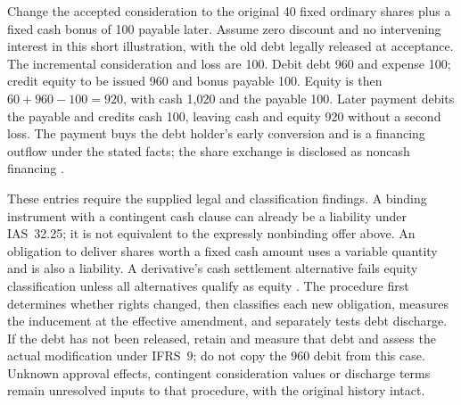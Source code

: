 Change the accepted consideration to the original 40 fixed ordinary shares
plus a fixed cash bonus of 100 payable later. Assume zero discount and no
intervening interest in this short illustration, with the old debt legally
released at acceptance. The incremental consideration and loss are 100.
Debit debt 960 and expense 100; credit equity to be issued 960 and bonus
payable 100. Equity is then $60+960-100=920$, with cash 1,020 and the payable
100. Later payment debits the payable and credits cash 100, leaving cash and
equity 920 without a second loss. The payment buys the debt holder's early
conversion and is a financing outflow under the stated facts; the share
exchange is disclosed as noncash financing
\citep[IAS~32.AG35; IAS~7.6, 17, 43--44]{eu20231803}.

These entries require the supplied legal and classification findings. A binding
instrument with a contingent cash clause can already be a liability under
IAS~32.25; it is not equivalent to the expressly nonbinding offer above.
An obligation to deliver shares worth a fixed cash amount uses a variable
quantity and is also a liability. A derivative's cash settlement alternative
fails equity classification unless all alternatives qualify as equity
\citep[IAS~32.19, 21, 25--27]{eu20231803}. The procedure first determines
whether rights changed, then classifies each new obligation, measures the
inducement at the effective amendment, and separately tests debt discharge.
If the debt has not been released, retain and measure that debt and assess the
actual modification under IFRS~9; do not copy the 960 debit from this case.
Unknown approval effects, contingent consideration values or discharge terms
remain unresolved inputs to that procedure, with the original history intact.
